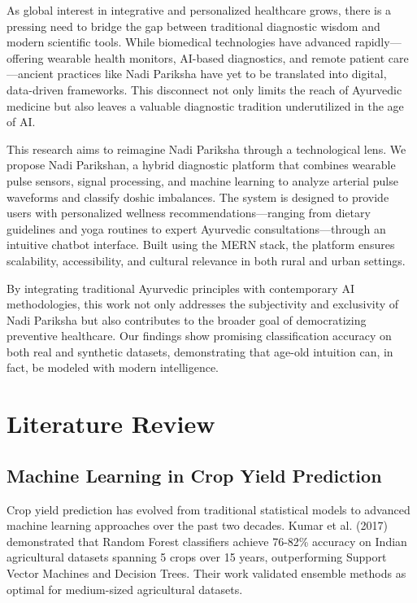 \documentclass[10pt,twocolumn]{article}
\begin{document}
As global interest in integrative and personalized healthcare grows, there is a pressing need to bridge the gap between traditional diagnostic wisdom and modern scientific tools. While biomedical technologies have advanced rapidly—offering wearable health monitors, AI-based diagnostics, and remote patient care—ancient practices like Nadi Pariksha have yet to be translated into digital, data-driven frameworks. This disconnect not only limits the reach of Ayurvedic medicine but also leaves a valuable diagnostic tradition underutilized in the age of AI.

This research aims to reimagine Nadi Pariksha through a technological lens. We propose Nadi Parikshan, a hybrid diagnostic platform that combines wearable pulse sensors, signal processing, and machine learning to analyze arterial pulse waveforms and classify doshic imbalances. The system is designed to provide users with personalized wellness recommendations—ranging from dietary guidelines and yoga routines to expert Ayurvedic consultations—through an intuitive chatbot interface. Built using the MERN stack, the platform ensures scalability, accessibility, and cultural relevance in both rural and urban settings.

By integrating traditional Ayurvedic principles with contemporary AI methodologies, this work not only addresses the subjectivity and exclusivity of Nadi Pariksha but also contributes to the broader goal of democratizing preventive healthcare. Our findings show promising classification accuracy on both real and synthetic datasets, demonstrating that age-old intuition can, in fact, be modeled with modern intelligence.

\section{Literature Review}
\subsection{Machine Learning in Crop Yield Prediction}
Crop yield prediction has evolved from traditional statistical models to advanced machine learning approaches over the past two decades. Kumar et al. (2017) demonstrated that Random Forest classifiers achieve 76-82\% accuracy on Indian agricultural datasets spanning 5 crops over 15 years, outperforming Support Vector Machines and Decision Trees. Their work validated ensemble methods as optimal for medium-sized agricultural datasets.
\end{document}
